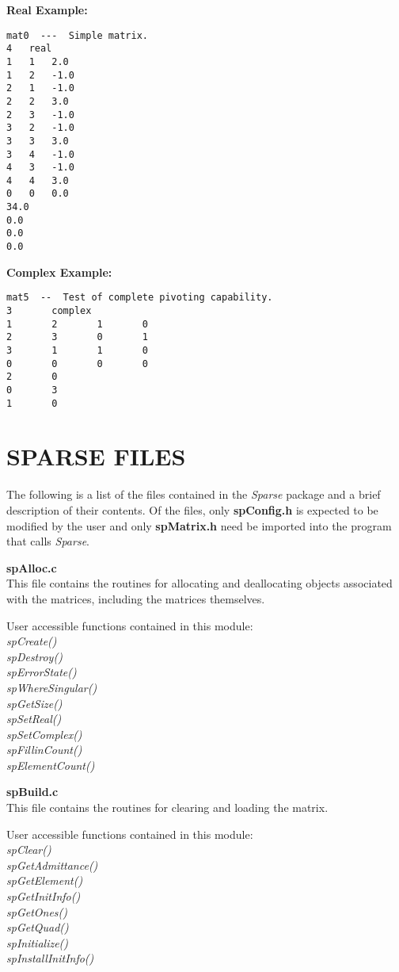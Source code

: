 \documentclass[11pt]{article}
\begin{document}
{\bf Real Example:}
\begin{verbatim}
mat0  ---  Simple matrix.
4	real
1	1	2.0
1	2	-1.0
2	1	-1.0
2	2	3.0
2	3	-1.0
3	2	-1.0
3	3	3.0
3	4	-1.0
4	3	-1.0
4	4	3.0
0	0	0.0
34.0
0.0
0.0
0.0
\end{verbatim}

{\bf Complex Example:}
\begin{verbatim}
mat5  --  Test of complete pivoting capability.
3       complex
1       2       1       0
2       3       0       1
3       1       1       0
0       0       0       0
2       0
0       3
1       0
\end{verbatim}

\section{SPARSE FILES}
The following is a list of the files contained in the \emph{Sparse}
package and a brief description of their contents.  Of the files, only
{\bf spConfig.h} is expected to be modified by the user and only
{\bf spMatrix.h} need be imported into the program that calls \emph{Sparse}.

{\bf spAlloc.c}\\
This file contains the routines for allocating and deallocating objects
associated with the matrices, including the matrices themselves.

User accessible functions contained in this module:\emph{\\
spCreate()\\
spDestroy()\\
spErrorState()\\
spWhereSingular()\\
spGetSize()\\
spSetReal()\\
spSetComplex()\\
spFillinCount()\\
spElementCount()
}

{\bf spBuild.c}\\
This file contains the routines for clearing and loading the matrix.

User accessible functions contained in this module:\emph{\\
spClear()\\
spGetAdmittance()\\
spGetElement()\\
spGetInitInfo()\\
spGetOnes()\\
spGetQuad()\\
spInitialize()\\
spInstallInitInfo()
}
\end{document}
